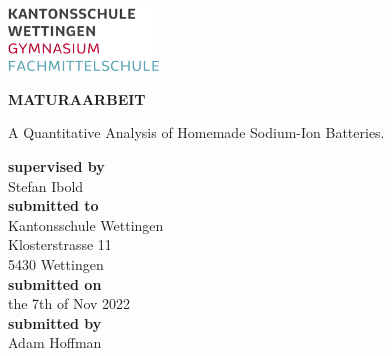 \begin{titlepage}
\includegraphics[width=0.3\textwidth]{images/kswe_logo.png}
\begin{center}
\vspace{5.5cm}
\Huge
\textbf{MATURAARBEIT}
\vspace{1cm}\\
\begin{LARGE}
A Quantitative Analysis of Homemade Sodium-Ion Batteries.\\
\end{LARGE}
\vspace{3.5cm}
\small
\textbf{supervised by}
\vspace{0.2cm}\\
Stefan Ibold
\vspace{1cm}\\
\textbf{submitted to}
\vspace{0.2cm}\\
Kantonsschule Wettingen\\
Klosterstrasse 11\\
5430 Wettingen
\vspace{1cm}\\
\textbf{submitted on}
\vspace{0.2cm}\\
the 7th of Nov 2022
\vspace{1cm}\\
\textbf{submitted by}
\vspace{0.2cm}\\
Adam Hoffman
\end{center}
\end{titlepage}